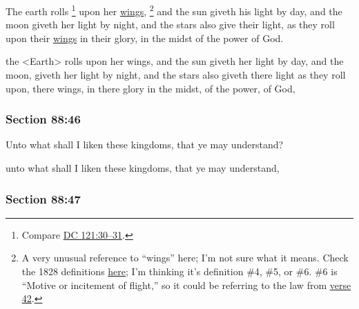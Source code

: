 		The earth rolls%
			\footnote{%
				Compare \hyperref[DC121-30]{DC 121:30--31}.
				}
		upon her \hyperref[WING]{wings},%
			\footnote{%
				A very unusual reference to ``wings'' here; I'm not sure what it means. Check the 1828 definitions \hyperref[WING]{here}; I'm thinking it's definition \#4, \#5, or \#6. \#6 is ``Motive or incitement of flight,'' so it could be referring to the law from \hyperref[DC88-42]{verse 42}.
				}
		and the sun giveth his light by day, and the moon giveth her light by night, and the stars also give their light, as they roll upon their \hyperref[WING]{wings} in their glory, in the midst of the power of God.

		\begin{framed}
		\scriptsize
			\begin{compactdesc}
				\item[JSP] the <Earth> rolls upon her wings, and the sun giveth her light by day, and the moon, giveth her light by night, and the stars also giveth there light as they roll upon, there wings, in there glory in the midst, of the power, of God,
			\end{compactdesc}
		\end{framed}

	\subsubsection{Section 88:46} %
		\label{DC88-46}

		Unto what shall I liken these kingdoms, that ye may understand?

		\begin{framed}
		\scriptsize
			\begin{compactdesc}
				\item[JSP] unto what shall I liken these kingdoms, that ye may understand,
			\end{compactdesc}
		\end{framed}

	\subsubsection{Section 88:47} %
		\label{DC88-47}

